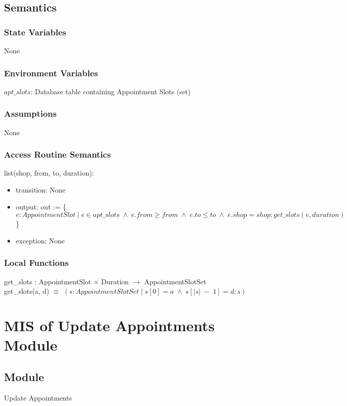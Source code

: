 \documentclass[12pt, titlepage]{article}
\begin{document}
\subsection{Semantics}

\subsubsection{State Variables}
None

\subsubsection{Environment Variables}
$apt\_slots$: Database table containing Appointment Slots (set)

\subsubsection{Assumptions}
None

\subsubsection{Access Routine Semantics}
\noindent list(shop, from, to, duration):
\begin{itemize}
\item transition: None
\item output: 
out := \{$e: AppointmentSlot \; | \; e \in apt\_slots \; \land \; e.from \ge from \; \land \; e.to \le to \; \land \; e.shop = shop : get\_slots(e, duration)$\}
\item exception: None 
\end{itemize}


\subsubsection{Local Functions}
get\_slots : AppointmentSlot $\times$ Duration $\rightarrow$ AppointmentSlotSet \\
get\_slots(a, d) $\equiv$ $(s:AppointmentSlotSet \; | \; s[0] = a \; \land \; s[|s| \; - \; 1] = d : s)$

\newpage

\section{MIS of Update Appointments Module} \label{mUpdateAppointments}

\subsection{Module}
Update Appointments
\end{document}
